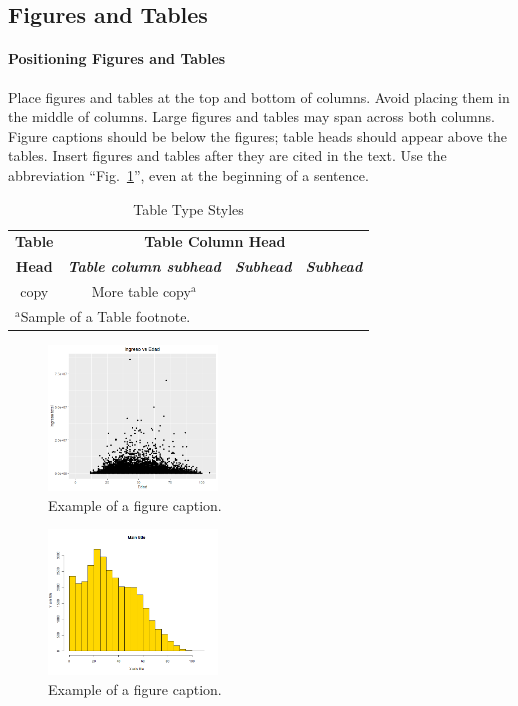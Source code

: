 \documentclass[conference, 10pt]{IEEEtran}
\begin{document}
\subsection{Figures and Tables}
\paragraph{Positioning Figures and Tables} Place figures and tables at the top and 
bottom of columns. Avoid placing them in the middle of columns. Large 
figures and tables may span across both columns. Figure captions should be 
below the figures; table heads should appear above the tables. Insert 
figures and tables after they are cited in the text. Use the abbreviation 
``Fig.~\ref{fig}'', even at the beginning of a sentence.

\begin{table}[htbp]
\caption{Table Type Styles}
\begin{center}
\begin{tabular}{|c|c|c|c|}
\hline
\textbf{Table}&\multicolumn{3}{|c|}{\textbf{Table Column Head}} \\
\cline{2-4} 
\textbf{Head} & \textbf{\textit{Table column subhead}}& \textbf{\textit{Subhead}}& \textbf{\textit{Subhead}} \\
\hline
copy& More table copy$^{\mathrm{a}}$& &  \\
\hline
\multicolumn{4}{l}{$^{\mathrm{a}}$Sample of a Table footnote.}
\end{tabular}
\label{tab1}
\end{center}
\end{table}

\begin{figure}[htbp]
\centerline{\includegraphics[width=0.4\textwidth]{../Vistas/Rplot01.png}}
\caption{Example of a figure caption.}
\label{fig}
\end{figure}

\begin{figure}[htbp]
\centerline{\includegraphics[width=0.4\textwidth]{../Vistas/Graficca_3.png}}
\caption{Example of a figure caption.}
\label{fig2}
\end{figure}
\end{document}
